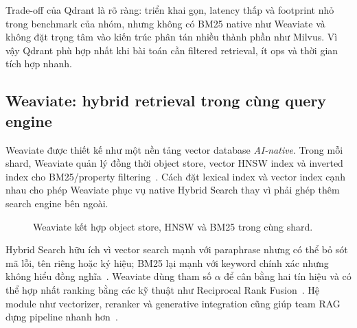 Trade-off của Qdrant là rõ ràng: triển khai gọn, latency thấp và footprint nhỏ trong benchmark của nhóm, nhưng không có BM25 native như Weaviate và không đặt trọng tâm vào kiến trúc phân tán nhiều thành phần như Milvus. Vì vậy Qdrant phù hợp nhất khi bài toán cần filtered retrieval, ít ops và thời gian tích hợp nhanh.

\subsection{Weaviate: hybrid retrieval trong cùng query engine}
\label{sec:weaviate}

Weaviate được thiết kế như một nền tảng vector database \textit{AI-native}. Trong mỗi shard, Weaviate quản lý đồng thời object store, vector HNSW index và inverted index cho BM25/property filtering~\cite{weaviatedocs}. Cách đặt lexical index và vector index cạnh nhau cho phép Weaviate phục vụ native Hybrid Search thay vì phải ghép thêm search engine bên ngoài.

\begin{figure}[H]
\centering
{}
\caption{Weaviate kết hợp object store, HNSW và BM25 trong cùng shard.}
\label{fig:weaviate-arch}
\end{figure}

Hybrid Search hữu ích vì vector search mạnh với paraphrase nhưng có thể bỏ sót mã lỗi, tên riêng hoặc ký hiệu; BM25 lại mạnh với keyword chính xác nhưng không hiểu đồng nghĩa~\cite{robertson2009bm25}. Weaviate dùng tham số $\alpha$ để cân bằng hai tín hiệu và có thể hợp nhất ranking bằng các kỹ thuật như Reciprocal Rank Fusion~\cite{weaviatehybrid,cormack2009rrf}. Hệ module như vectorizer, reranker và generative integration cũng giúp team RAG dựng pipeline nhanh hơn~\cite{weaviatemodules}.

